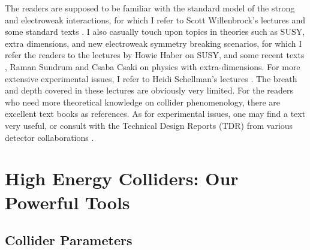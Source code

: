 \documentclass[12pt,prd,aps,floats,preprintnumbers,preprint,superscriptaddress,floatfix,nofootinbib]{revtex4}
\begin{document}
The readers are supposed to be familiar with the standard model of the
strong and electroweak interactions, 
for which I refer to Scott Willenbrock's lectures \cite{scott-sm}
and some standard texts \cite{books-sm}. 
I also casually touch upon topics in theories such as SUSY, 
extra dimensions, and new electroweak
symmetry breaking scenarios, for which I refer the readers to the 
lectures by Howie Haber \cite{howie-susy,PDG} on SUSY, and some recent 
texts \cite{books-susy}, 
Raman Sundrum \cite{raman-extrad} and Csaba Csaki \cite{csaba-higgs}
on physics with extra-dimensions. 
For more extensive experimental issues, 
I refer to Heidi Schellman's lectures \cite{exp}. 
The breath and depth covered in these lectures are obviously very limited.
For the readers who need more theoretical knowledge  on collider phenomenology,
there are excellent text books \cite{bp,esw} as references.
As for experimental issues, one may find a text \cite{book-exp} very
useful, or consult with the Technical Design Reports
(TDR) from various detector collaborations \cite{ATLAS,CMS,ILC}.

\section{High Energy Colliders: Our Powerful Tools}
\label{collider}

\subsection{ Collider Parameters}
\end{document}
